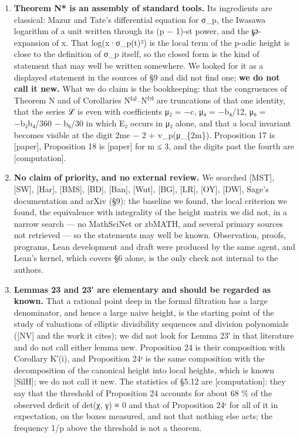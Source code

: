 \documentclass[11pt,a4paper]{article}
\theoremstyle{named}
\begin{document}
\begin{enumerate}[leftmargin=1.4em,itemsep=.2em,topsep=.3em]
\item \textbf{Theorem N* is an assembly of standard tools.} Its ingredients are classical: Mazur and Tate's differential equation for σ\_p, the Iwasawa logarithm of a unit written through its (p − 1)-st power, and the ℘-expansion of x. That log(x·σ\_p(t)²) is the local term of the p-adic height is close to the definition of σ\_p itself, so the closed form is the kind of statement that may well be written somewhere. We looked for it as a displayed statement in the sources of §9 and did not find one; \textbf{we do not call it new.} What we do claim is the bookkeeping: that the congruences of Theorem N and of Corollaries N⁽³⁾–N⁽⁷⁾ are truncations of that one identity, that the series ℒ is even with coefficients μ₂ = −c, μ₄ = −b₄/12, μ₆ = −b₂b₄/360 − b₆/30 in which E₂ occurs in μ₂ alone, and that a local invariant becomes visible at the digit 2me − 2 + v\_p(μ\_\{2m\}). Proposition 17 is [paper], Proposition 18 is [paper] for m ≤ 3, and the digits past the fourth are [computation].
\item \textbf{No claim of priority, and no external review.} We searched [MST], [SW], [Har], [BMS], [BD], [Ban], [Wut], [BG], [LR], [OY], [DW], Sage's documentation and arXiv (§9): the baseline we found, the local criterion we found, the equivalence with integrality of the height matrix we did not, in a narrow search — no MathSciNet or zbMATH, and several primary sources not retrieved — so the statements may well be known. Observation, proofs, programs, Lean development and draft were produced by the same agent, and Lean's kernel, which covers §6 alone, is the only check not internal to the authors.
\item \textbf{Lemmas 23 and 23′ are elementary and should be regarded as known.} That a rational point deep in the formal filtration has a large denominator, and hence a large naive height, is the starting point of the study of valuations of elliptic divisibility sequences and division polynomials ([NV] and the work it cites); we did not look for Lemma 23′ in that literature and do not call either lemma new. Proposition 24 is their composition with Corollary K′(i), and Proposition 24ᶜ is the same composition with the decomposition of the canonical height into local heights, which is known [SilH]; we do not call it new. The statistics of §5.12 are [computation]: they say that the threshold of Proposition 24 accounts for about 68 \% of the observed deficit of det(χ, γ) ≡ 0 and that of Proposition 24ᶜ for all of it in expectation, on the boxes measured, and not that nothing else acts; the frequency 1/p above the threshold is not a theorem.

\end{enumerate}
\end{document}
